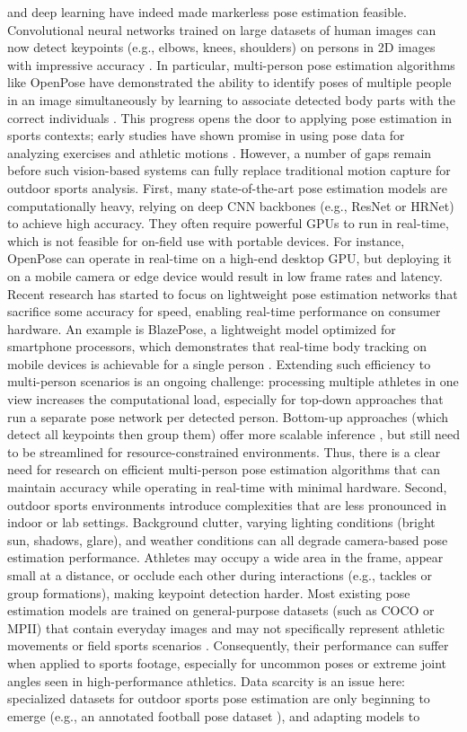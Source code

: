 and deep learning have indeed made markerless pose estimation feasible. Convolutional neural networks trained on large datasets of human images can now detect keypoints (e.g., elbows, knees, shoulders) on persons in 2D images with impressive accuracy \cite{Cao2017}. In particular, multi-person pose estimation algorithms like OpenPose have demonstrated the ability to identify poses of multiple people in an image simultaneously by learning to associate detected body parts with the correct individuals \cite{Cao2017OpenPose}. This progress opens the door to applying pose estimation in sports contexts; early studies have shown promise in using pose data for analyzing exercises and athletic motions \cite{Badiola2021}. However, a number of gaps remain before such vision-based systems can fully replace traditional motion capture for outdoor sports analysis. First, many state-of-the-art pose estimation models are computationally heavy, relying on deep CNN backbones (e.g., ResNet or HRNet) to achieve high accuracy. They often require powerful GPUs to run in real-time, which is not feasible for on-field use with portable devices. For instance, OpenPose can operate in real-time on a high-end desktop GPU, but deploying it on a mobile camera or edge device would result in low frame rates and latency. Recent research has started to focus on lightweight pose estimation networks that sacrifice some accuracy for speed, enabling real-time performance on consumer hardware. An example is BlazePose, a lightweight model optimized for smartphone processors, which demonstrates that real-time body tracking on mobile devices is achievable for a single person \cite{Bazarevsky2020}. Extending such efficiency to multi-person scenarios is an ongoing challenge: processing multiple athletes in one view increases the computational load, especially for top-down approaches that run a separate pose network per detected person. Bottom-up approaches (which detect all keypoints then group them) offer more scalable inference \cite{OpenPose}, but still need to be streamlined for resource-constrained environments. Thus, there is a clear need for research on efficient multi-person pose estimation algorithms that can maintain accuracy while operating in real-time with minimal hardware. Second, outdoor sports environments introduce complexities that are less pronounced in indoor or lab settings. Background clutter, varying lighting conditions (bright sun, shadows, glare), and weather conditions can all degrade camera-based pose estimation performance. Athletes may occupy a wide area in the frame, appear small at a distance, or occlude each other during interactions (e.g., tackles or group formations), making keypoint detection harder. Most existing pose estimation models are trained on general-purpose datasets (such as COCO or MPII) that contain everyday images and may not specifically represent athletic movements or field sports scenarios \cite{Suo2024}. Consequently, their performance can suffer when applied to sports footage, especially for uncommon poses or extreme joint angles seen in high-performance athletics. Data scarcity is an issue here: specialized datasets for outdoor sports pose estimation are only beginning to emerge (e.g., an annotated football pose dataset \cite{Nibali2021}), and adapting models to 